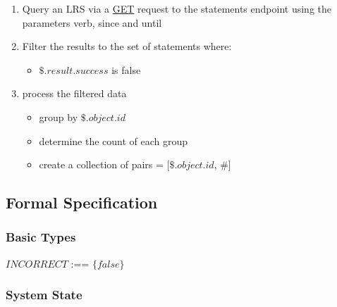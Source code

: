 \documentclass{article}
\begin{document}
\begin{enumerate}
\item Query an LRS via a \href{https://github.com/adlnet/xAPI-Spec/blob/master/xAPI-Communication.md#213-get-statements}{GET} request to the statements endpoint using the parameters verb, since and until
\item Filter the results to the set of statements where:
  \begin{itemize}
  \item $\$.result.success$ is false
  \end{itemize}
\item process the filtered data
  \begin{itemize}
  \item group by $\$.object.id$
  \item determine the count of each group
  \item create a collection of pairs = [$\$.object.id$, \#]
  \end{itemize}
\end{enumerate}

\subsection{Formal Specification}

\subsubsection{Basic Types}

$INCORRECT$ :== $\{false\}$

\subsubsection{System State}
\end{document}
